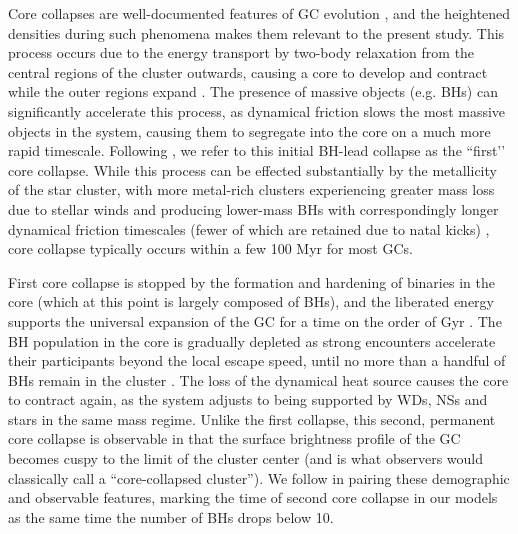 \documentclass[twocolumn,linenumbers]{aastex631}
\begin{document}
Core collapses are well-documented features of GC evolution \citep[e.g.][]{1968MNRAS.138..495L, 2001A&A...375..711F, 2006MNRAS.368..121F, 2008gady.book.....B, 2020IAUS..351..357K}, and the heightened densities during such phenomena makes them relevant to the present study.
This process occurs due to the energy transport by two-body relaxation from the central regions of the cluster outwards, causing a core to develop and contract while the outer regions expand \cite{2003gmbp.book.....H}.
The presence of massive objects (e.g. BHs) can significantly accelerate this process, as dynamical friction slows the most massive objects in the system, causing them to segregate into the core on a much more rapid timescale\cite{2008gady.book.....B}.
Following \cite{2013MNRAS.432.2779B}, we refer to this initial BH-lead collapse as the ``first’’ core collapse.
While this process can be effected substantially by the metallicity of the star cluster, with more metal-rich clusters experiencing greater mass loss due to stellar winds and producing lower-mass BHs with correspondingly longer dynamical friction timescales (fewer of which are retained due to natal kicks) \cite{2022arXiv220316547R}, core collapse typically occurs within a few 100 Myr for most GCs. 



First core collapse is stopped by the formation and hardening of binaries in the core (which at this point is largely composed of BHs), and the liberated energy supports the universal expansion of the GC for a time on the order of Gyr \citep{2012MNRAS.420..309B}.
The BH population in the core is gradually depleted as strong encounters accelerate their participants beyond the local escape speed, until no more than a handful of BHs remain in the cluster \citep{2013MNRAS.432.2779B, 2020IAUS..351..357K}.
The loss of the dynamical heat source causes the core to contract again, as the system adjusts to being supported by WDs, NSs and stars in the same mass regime.
Unlike the first collapse, this second, permanent core collapse is observable in that the surface brightness profile of the GC becomes cuspy to the limit of the cluster center (and is what observers would classically call a ``core-collapsed cluster'').
We follow \citet{2018ApJ...855L..15K} in pairing these demographic and observable features, marking the time of second core collapse in our models as the same time the number of BHs drops below 10.
\end{document}
